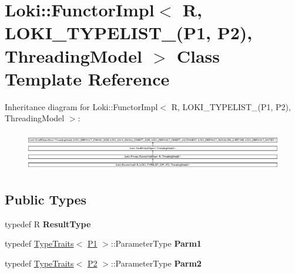 \hypertarget{classLoki_1_1FunctorImpl_3_01R_00_01LOKI__TYPELIST__2_07P1_00_01P2_08_00_01ThreadingModel_01_4}{}\section{Loki\+:\+:Functor\+Impl$<$ R, L\+O\+K\+I\+\_\+\+T\+Y\+P\+E\+L\+I\+S\+T\+\_(P1, P2), Threading\+Model $>$ Class Template Reference}
\label{classLoki_1_1FunctorImpl_3_01R_00_01LOKI__TYPELIST__2_07P1_00_01P2_08_00_01ThreadingModel_01_4}
Inheritance diagram for Loki\+:\+:Functor\+Impl$<$ R, L\+O\+K\+I\+\_\+\+T\+Y\+P\+E\+L\+I\+S\+T\+\_(P1, P2), Threading\+Model $>$\+:\begin{figure}[H]
\begin{center}
\leavevmode
\includegraphics[height=1.751368cm]{classLoki_1_1FunctorImpl_3_01R_00_01LOKI__TYPELIST__2_07P1_00_01P2_08_00_01ThreadingModel_01_4}
\end{center}
\end{figure}
\subsection*{Public Types}
\begin{DoxyCompactItemize}
\item 
\hypertarget{classLoki_1_1FunctorImpl_3_01R_00_01LOKI__TYPELIST__2_07P1_00_01P2_08_00_01ThreadingModel_01_4_a9f6b8b7f7baf69f5f92c0f8bf41c841d}{}typedef R {\bfseries Result\+Type}\label{classLoki_1_1FunctorImpl_3_01R_00_01LOKI__TYPELIST__2_07P1_00_01P2_08_00_01ThreadingModel_01_4_a9f6b8b7f7baf69f5f92c0f8bf41c841d}

\item 
\hypertarget{classLoki_1_1FunctorImpl_3_01R_00_01LOKI__TYPELIST__2_07P1_00_01P2_08_00_01ThreadingModel_01_4_a1e666ee6c808a755a97427ebc48cf6dc}{}typedef \hyperlink{classLoki_1_1TypeTraits}{Type\+Traits}$<$ \hyperlink{structP1}{P1} $>$\+::Parameter\+Type {\bfseries Parm1}\label{classLoki_1_1FunctorImpl_3_01R_00_01LOKI__TYPELIST__2_07P1_00_01P2_08_00_01ThreadingModel_01_4_a1e666ee6c808a755a97427ebc48cf6dc}

\item 
\hypertarget{classLoki_1_1FunctorImpl_3_01R_00_01LOKI__TYPELIST__2_07P1_00_01P2_08_00_01ThreadingModel_01_4_a3fd0659972ab980221ef1232216979a2}{}typedef \hyperlink{classLoki_1_1TypeTraits}{Type\+Traits}$<$ \hyperlink{structP2}{P2} $>$\+::Parameter\+Type {\bfseries Parm2}\label{classLoki_1_1FunctorImpl_3_01R_00_01LOKI__TYPELIST__2_07P1_00_01P2_08_00_01ThreadingModel_01_4_a3fd0659972ab980221ef1232216979a2}

\end{DoxyCompactItemize}
